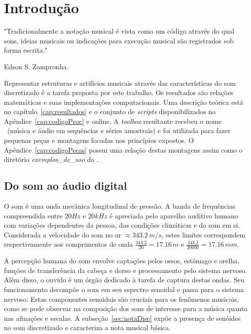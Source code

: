 \chapter{Introdução} %
\label{cap:intro} 
\epigraph{"Tradicionalmente a notação musical é vista como um código através do qual sons, ideias musicais ou indicações para execução musical são registrados sob forma escrita."}{Edson S. Zampronha.\cite{Zampronha} \\}


Representar estruturas e artifícios musicais através das características do som discretizado
é a tarefa proposta por este trabalho. Os resultados são relações matemáticas e suas implementações computacionais. Uma descrição teórica está no capítulo~\ref{cap:resultados} e o conjunto de \emph{scripts} disponibilizados no Apêndice~\ref{cap:codigoProc} e online.\cite{MASSA} A \emph{toolbox} resultante recebeu o nome \massa\ (música e áudio em sequências e séries amostrais) e foi utilizada para fazer pequenas peças e montagens focadas nos princípios expostos. O Apêndice~\ref{cap:codigoPecas} possui uma relação destas montagens assim como o diretório \emph{exemplos\_de\_uso} da \massa.

    \section{Do som ao áudio digital}\label{sec:audio}

O som é uma onda mecânica longitudinal de pressão. A banda de frequências compreendida entre $20Hz$ e $20 kHz$ é apreciada pelo aparelho auditivo humano com variações dependentes da pessoa, das condições climáticas e do som em si.
 Considerada a velocidade do som no ar $\approx 343.2\,m/s$,
estes limites correspondem respectivamente aos comprimentos de onda $\frac{343.2}{20} = 17.16\,m$ e $\frac{343.2}{20000}=17.16\,mm$.\cite{Roederer}


A percepção humana do som envolve captações pelos ossos, estômago e orelha, funções de transferência da cabeça e dorso e processamento pelo sistema nervoso. Além disso, o ouvido é um órgão dedicado à tarefa de captura destas ondas. Seu funcionamento decompõe o som em seu espectro senoidal e passa para o sistema nervoso.\cite{Roederer} Estas componentes senoidais são cruciais para os fenômenos musicais, como se pode observar na composição dos sons de interesse para a música quanto nas afinações e escalas.\cite{floEsp} A subseção~\ref{sec:notaDisc} expõe a presença de senóides no som discretizado e caracteriza a nota musical básica.

